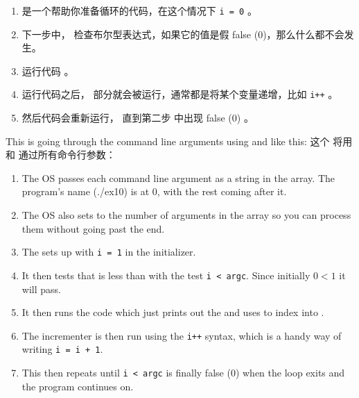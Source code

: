 \begin{enumerate}
\item {} 是一个帮助你准备循环的代码，在这个情况下 \verb|i = 0| 。
\item 下一步中，  检查布尔型表达式，如果它的值是假 false (0)，那么什么都不会发生。
\item 运行代码  。
\item 运行代码之后， 部分就会被运行，通常都是将某个变量递增，比如 \verb|i++| 。
\item 然后代码会重新运行， 直到第二步  中出现 false (0) 。
\end{enumerate}

This  is going through the command line arguments 
using  and  like this:
这个  将用  和  通过所有命令行参数：

\begin{enumerate}
\item The OS passes each command line argument as a string in the 
    array.  The program's name (./ex10) is at 0, with the rest coming after it.
\item The OS also sets  to the number of arguments in the 	
	 array so you can process them without going past the end.
\item The  sets up with \verb|i = 1| in the initializer.
\item It then tests that  is less than  with the
    test \verb|i < argc|. Since initially $0 < 1$ it will pass.
\item It then runs the code which just prints out the  and 
    uses  to index into .
\item The incrementer is then run using the \verb|i++| syntax, which is
    a handy way of writing \verb|i = i + 1|.
\item This then repeats until \verb|i < argc| is finally false (0) when
    the loop exits and the program continues on.
\end{enumerate}

